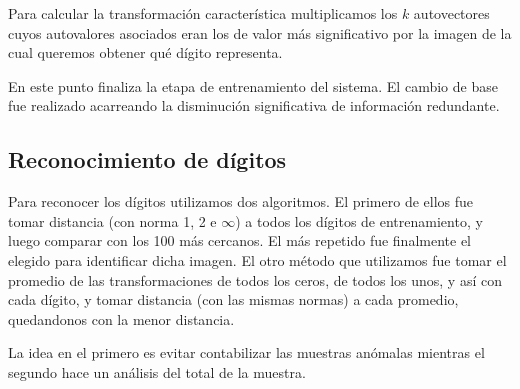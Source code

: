 Para calcular la transformaci\'on caracter\'istica multiplicamos los $k$ 
autovectores cuyos autovalores asociados eran los de valor m\'as significativo 
por la imagen de la cual queremos obtener qu\'e d\'igito representa.

En este punto finaliza la etapa de entrenamiento del sistema. El cambio de base
fue realizado acarreando la disminuci\'on significativa de informaci\'on
redundante. 

\subsection{Reconocimiento de d\'igitos}
Para reconocer los d\'igitos utilizamos dos algoritmos. El primero de ellos fue tomar distancia (con norma 1, 2 e $\infty$) a
todos los d\'igitos de entrenamiento, y luego comparar con los 100 m\'as cercanos. El m\'as repetido fue finalmente
el elegido para identificar dicha imagen. El otro m\'etodo que utilizamos fue tomar el promedio de las transformaciones
de todos los ceros, de todos los unos, y as\'i con cada d\'igito, y tomar distancia (con las mismas normas)
a cada promedio, quedandonos con la menor distancia.

La idea en el primero es evitar contabilizar las muestras an\'omalas mientras el
segundo hace un an\'alisis del total de la muestra.
